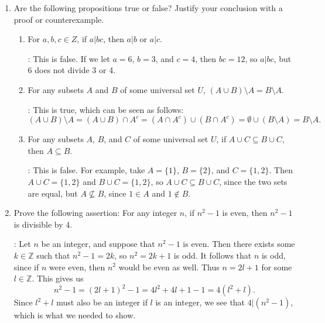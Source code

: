 \documentclass[12pt]{article}
\newcommand{\points}[1]{\marginpar{\hspace{24pt}[#1]}}
\newcommand{\Z}{\mathbb{Z}}
\begin{document}
\begin{enumerate}
\newpage

\item Are the following propositions true or false? Justify your conclusion with a proof or counterexample.
\begin{enumerate}
\item For $a,b,c\in Z$, if $a|bc$, then $a|b$ or $a|c$.\points{3}


\bigskip

: This is false. If we let $a=6$, $b=3$, and $c=4$, then $bc=12$, so $a|bc$, but 6 does not divide 3 or 4.

\bigskip


\item For any subsets $A$ and $B$ of some universal set $U$, $(A\cup B)\setminus A = B\setminus A$. \points{4}


\bigskip

: This is true, which can be seen as follows:
\[
 (A\cup B)\setminus A = (A\cup B)\cap A^c = (A\cap A^c)\cup (B\cap A^c) = \emptyset\cup (B\setminus A) = B\setminus A.
\]


\bigskip


\item For any subsets $A$, $B$, and $C$ of some universal set $U$, if $A\cup C\subseteq B\cup C$, then $A\subseteq B$. \points{4}

\bigskip

: This is false. For example, take $A=\{1\}$, $B=\{2\}$, and $C=\{1,2\}$. Then $A\cup C = \{1,2\}$ and $B\cup C = \{1,2\}$, so $A\cup C\subseteq B\cup C$, since the two sets are equal, but $A\nsubseteq B$, since $1\in A$ and $1\notin B$.

\bigskip

\end{enumerate}
\newpage

\item Prove the following assertion: For any integer $n$, if $n^2-1$ is even, then $n^2-1$ is divisible by 4. \points{4}


\bigskip

: Let $n$ be an integer, and suppose that $n^2-1$ is even. Then there exists some $k\in\Z$ such that $n^2-1=2k$, so $n^2=2k+1$ is odd. It follows that $n$ is odd, since if $n$ were even, then $n^2$ would be even as well. Thus $n=2l+1$ for some $l\in\Z$. This gives us
\[
 n^2-1 = (2l+1)^2-1 = 4l^2+4l+1-1 = 4(l^2+l).
\]
Since $l^2+l$ must also be an integer if $l$ is an integer, we see that $4|(n^2-1)$, which is what we needed to show.


\end{enumerate}
\end{document}

